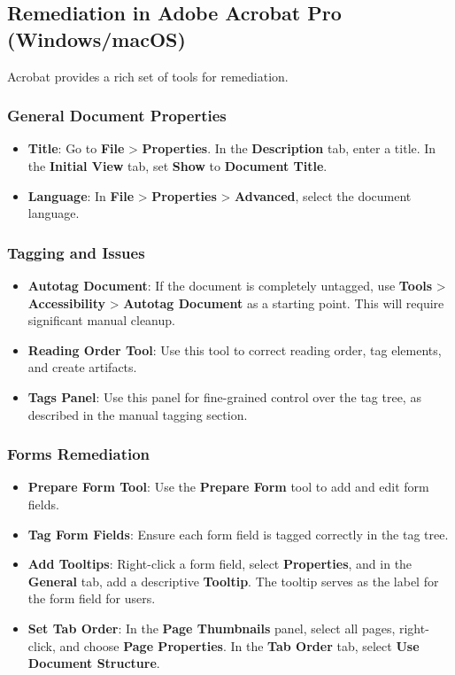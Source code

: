 \subsection{Remediation in Adobe Acrobat Pro (Windows/macOS)}
\label{subsec:remediation-in-acrobat}
Acrobat provides a rich set of tools for remediation.

\subsubsection{General Document Properties}
\label{ssubsec:general-doc-properties}
\begin{itemize}
	\item \textbf{Title}: Go to \textbf{File} > \textbf{Properties}. In the \textbf{Description} tab, enter a title. In the \textbf{Initial View} tab, set \textbf{Show} to \textbf{Document Title}.
	\item \textbf{Language}: In \textbf{File} > \textbf{Properties} > \textbf{Advanced}, select the document language.
\end{itemize}

\subsubsection{Tagging and  Issues}
\label{ssubsec:tagging-reading-order-issues}
\begin{itemize}
	\item \textbf{Autotag Document}: If the document is completely untagged, use \textbf{Tools} > \textbf{Accessibility} > \textbf{Autotag Document} as a starting point. This will require significant manual cleanup.
	\item \textbf{Reading Order Tool}: Use this tool to correct reading order, tag elements, and create artifacts.
	\item \textbf{Tags Panel}: Use this panel for fine-grained control over the tag tree, as described in the manual tagging section.
\end{itemize}

\subsubsection{Forms Remediation}
\label{ssubsec:forms-remediation}
\begin{itemize}
	\item \textbf{Prepare Form Tool}: Use the \textbf{Prepare Form} tool to add and edit form fields.
	\item \textbf{Tag Form Fields}: Ensure each form field is tagged correctly in the tag tree.
	\item \textbf{Add Tooltips}: Right-click a form field, select \textbf{Properties}, and in the \textbf{General} tab, add a descriptive \textbf{Tooltip}. The tooltip serves as the label for the form field for  users.
	\item \textbf{Set Tab Order}: In the \textbf{Page Thumbnails} panel, select all pages, right-click, and choose \textbf{Page Properties}. In the \textbf{Tab Order} tab, select \textbf{Use Document Structure}.
\end{itemize}

